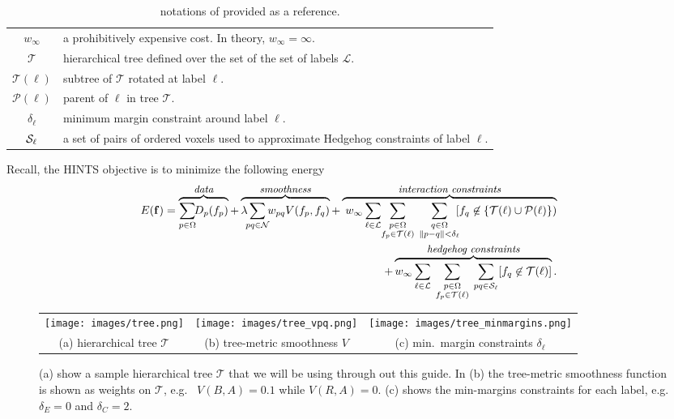 \documentclass[12pt,letterpaper]{article}
\def\Tree{\mathcal{T}}
\def\labelvars{\mathbf{f}}
\def\labelvar{f}
\def\pixelset{\Omega}
\def\neighbset{\mathcal{N}}
\def\labelset{\mathcal{L}}
\def\Tree{\mathcal{T}}
\def\margins{\delta}
\def\unary{D}
\def\parent{\mathcal{P}}
\def\pairwise{V}
\begin{document}
\begin{table}[h]
\begin{tabular}{|c|p{14.5cm}|}
$w_\infty$ & a prohibitively expensive cost. In theory, $w_\infty=\infty$.\\
$\Tree$ & hierarchical tree defined over the set of the set of labels $\labelset.$\\
$\Tree(\ell)$ & subtree of $\Tree$ rotated at label $\ell$.\\
$\parent(\ell)$ & parent of $\ell$ in tree $\Tree$.\\
$\margins_\ell$ & minimum margin constraint around label $\ell$.\\
${\cal S}_\ell$ & a set of pairs of ordered voxels used to approximate Hedgehog constraints of label $\ell$.\\
\hline
\end{tabular}
\caption{notations of \cite{hedgehogIsack,pathmovesIsack} provided as a reference.}
\label{tb:notation}
\end{table}

Recall, the HINTS objective \cite{pathmovesIsack} is to minimize the following energy
\begin{equation} \label{eqn:OurMainEnergy}
\begin{split}
\!\!\!\!\!\!E(\labelvars)= \overbrace{\sum_{p \in \pixelset} \!\!\unary_p(\labelvar_p)}^\text{\small {\em data}} + \overbrace{\lambda\!\!\sum_{pq \in \neighbset}\!\!w_{pq}V(\labelvar_p,\labelvar_q)}^\text{\small {\em smoothness}} + \overbrace{\phantom{\sum}\!\!\!\!\!\!\!w_\infty
\sum_{\mathclap{\substack{\ell \in \labelset}}} \;\;
\sum_{\mathclap{\substack{p\in\pixelset \\ \labelvar_p \in \Tree(\ell)} }}
\quad\sum_{\substack{ q\in\pixelset\\ \lVert p-q\rVert < \margins_{\ell}}}\!\![\labelvar_q \not\in \{\Tree(\ell) \cup \parent(\ell)  \})}^\text{\small \em interaction constraints}\\
+ \overbrace{w_{\infty}\sum_{\ell \in \labelset}\quad \sum_{\mathclap{\substack{p \in \pixelset\\ \labelvar_p \in \Tree(\ell)}}}\quad \sum_{pq \in {\mathcal S}_{\ell}} [\labelvar_q \not \in \Tree(\ell)]}^\text{\small \em hedgehog constraints}.
\end{split}
\end{equation}

\newpage

\begin{figure}[t]
\centering
\begin{tabular}{ccc}
\texttt{[image: images/tree.png]}&
\texttt{[image: images/tree\_vpq.png]}&
\texttt{[image: images/tree\_minmargins.png]}\\[-1ex]
(a) hierarchical tree $\Tree$ & (b) tree-metric smoothness $\pairwise$  & (c) min.~margin constraints $\margins_\ell$
\end{tabular}
\caption{(a) show a sample hierarchical tree $\Tree$ that we will be using through out this guide. In (b) the tree-metric smoothness function is shown as weights on $\Tree$, e.g.~ $V(B,A)=0.1$ while $V(R,A)=0.$ (c) shows the min-margins constraints for each label, e.g. $\margins_E=0$ and $\margins_C=2.$}
\label{fig:bsceg}
\end{figure}
\end{document}
